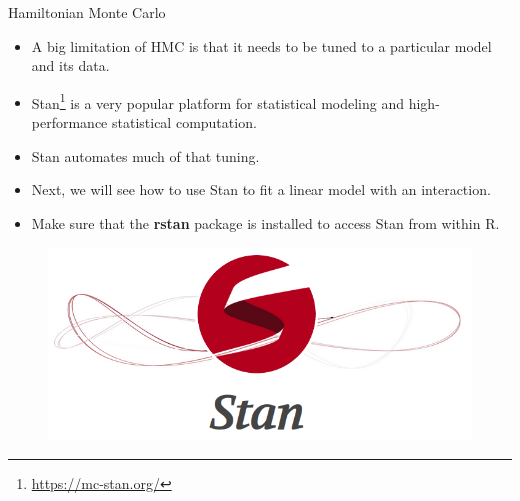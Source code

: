 \documentclass[handout]{beamer}
\begin{document}
\begin{frame}{Hamiltonian Monte Carlo}
\scriptsize{

\begin{itemize}
\item A big limitation of HMC is that it needs to be tuned to a particular model and its data.


\item Stan\footnote{\url{https://mc-stan.org/}} is a very popular platform for statistical modeling and high-performance statistical computation.


\item Stan automates much of that tuning.



\item Next, we will see how to use Stan to fit a linear model with an interaction. 

\item Make sure that the \textbf{rstan} package is installed to access Stan from within R.

\end{itemize}


 \begin{figure}[h!]
	\centering
	\includegraphics[scale=0.2]{pics/stan.png}
	\end{figure} 


} 
\end{frame}
\end{document}
